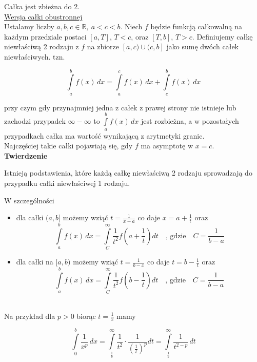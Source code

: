 \documentclass[12pt]{article}
\begin{document}
Całka jest zbieżna do 2. \\

\underline{Wersja całki obustronnej} \\

Ustalamy liczby $ a,b,c \in \mathbb{R}, \ a < c < b $. Niech $f$ będzie funkcją całkowalną na każdym przedziale postaci
$[a,T]$, $T < c$, oraz $ [T, b] $, $ T > c $. Definiujemy całkę niewłaściwą 2 rodzaju z $f$ na zbiorze $[a, c)\cup(c, b] $
jako sumę dwóch całek niewłaściwych. tzn.

$$ \int\limits_{a}^{b} f(x) \,dx = \int\limits_{a}^{c} f(x) \,dx + \int\limits_{c}^{b} f(x) \,dx $$

przy czym gdy przynajmniej jedna z całek z prawej strony nie istnieje lub zachodzi przypadek $ \infty - \infty $ to
$ \int\limits_{a}^{b} f(x) \,dx $ jest rozbieżna, a w pozostałych przypadkach całka ma wartość wynikającą z arytmetyki granic. \\

Najczęściej takie całki pojawiają się, gdy $f$ ma asymptotę w $x = c$. \\

\textbf{Twierdzenie}

Istnieją podstawienia, które każdą całkę niewłaściwą 2 rodzaju sprowadzają do przypadku całki niewłaściwej 1 rodzaju.

W szczególności

\begin{itemize}
    \item dla całki $(a,b]$ możemy wziąć $ t = \frac{1}{x - a} $ co daje $ x = a + \frac{1}{t} $ oraz
    $$ \int\limits_{a}^{b} f(x) \,dx = \int\limits_{C}^{\infty} \frac{1}{t^2} f \left(a + \frac{1}{t} \right) dt \quad
    \textrm{, gdzie} \quad C = \frac{1}{b - a} $$

    \item dla całki na $[a,b)$ możemy wziąć $t = \frac{1}{b - x}$ co daje $ t = b - \frac{1}{t} $ oraz
    $$ \int\limits_{a}^{b} f(x) \,dx = \int\limits_{C}^{\infty} \frac{1}{t^2} f \left(b - \frac{1}{t} \right) dt \quad
    \textrm{, gdzie} \quad C = \frac{1}{b - a} $$ \\
\end{itemize}

Na przykład dla $ p > 0 $ biorąc $ t = \frac{1}{x} $ mamy 

$$ \int\limits_{0}^{b} \frac{1}{x^p} \,dx = \int\limits_{\frac{1}{b}}^{\infty} \frac{1}{t^2} \cdot \frac{1}{ \left( \frac{1}{t} \right)^p } dt
= \int\limits_{\frac{1}{b}}^{\infty} \frac{1}{t^{2 - p}} \,dt $$
\end{document}
